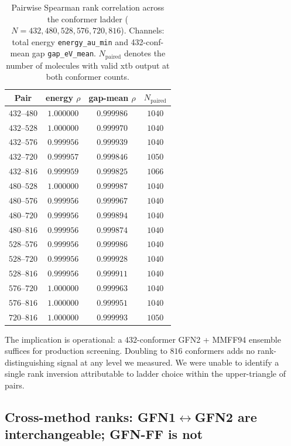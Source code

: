 \documentclass[11pt,a4paper]{article}
\begin{document}
\begin{table}[ht]
\centering
\caption{Pairwise Spearman rank correlation across the conformer ladder
($N = 432, 480, 528, 576, 720, 816$). Channels: total energy
\texttt{energy\_au\_min} and 432-conf-mean gap \texttt{gap\_eV\_mean}.
$N_{\text{paired}}$ denotes the number of molecules with valid xtb
output at both conformer counts.}
\label{tab:ladder}
\small
\begin{tabular}{cccc}
\toprule
Pair & energy $\rho$ & gap-mean $\rho$ & $N_{\text{paired}}$ \\
\midrule
$432$--$480$ & $1.000000$ & $0.999986$ & $1040$ \\
$432$--$528$ & $1.000000$ & $0.999970$ & $1040$ \\
$432$--$576$ & $0.999956$ & $0.999939$ & $1040$ \\
$432$--$720$ & $0.999957$ & $0.999846$ & $1050$ \\
$432$--$816$ & $0.999959$ & $0.999825$ & $1066$ \\
$480$--$528$ & $1.000000$ & $0.999987$ & $1040$ \\
$480$--$576$ & $0.999956$ & $0.999967$ & $1040$ \\
$480$--$720$ & $0.999956$ & $0.999894$ & $1040$ \\
$480$--$816$ & $0.999956$ & $0.999874$ & $1040$ \\
$528$--$576$ & $0.999956$ & $0.999986$ & $1040$ \\
$528$--$720$ & $0.999956$ & $0.999928$ & $1040$ \\
$528$--$816$ & $0.999956$ & $0.999911$ & $1040$ \\
$576$--$720$ & $1.000000$ & $0.999963$ & $1040$ \\
$576$--$816$ & $1.000000$ & $0.999951$ & $1040$ \\
$720$--$816$ & $1.000000$ & $0.999993$ & $1050$ \\
\bottomrule
\end{tabular}
\end{table}

The implication is operational: a $432$-conformer GFN2 + MMFF94 ensemble
suffices for production screening. Doubling to $816$ conformers adds
no rank-distinguishing signal at any level we measured. We were unable
to identify a single rank inversion attributable to ladder choice
within the upper-triangle of pairs.

\subsection{Cross-method ranks: GFN1$\leftrightarrow$GFN2 are interchangeable; GFN-FF is not}
\label{sec:results-cross-method}
\end{document}
